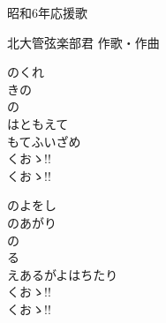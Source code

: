 \documentclass[10pt,b5j]{tarticle} %
\begin{document}
\begin{minipage}[c]{0.7\hsize} %
    \begin{center}
        {\LARGE
            昭和6年応援歌 %
        }
        {\small 
        }
    \end{center}
\end{minipage}
\begin{minipage}[c]{0.3\hsize} %
    \begin{flushright} %
        北大管弦楽部君 作歌・作曲 %
    \end{flushright}
\end{minipage}

\vspace{1.5em} %
\newcommand{\linespace}{0.5em} %
\newcommand{\blocksize}{0.5\hsize} %
\begin{enumerate} %
    \begin{minipage}[c]{\blocksize}
    
        \vspace{\linespace}
        \item
        のくれ\\
        きの\\
        の\\
        はともえて\\
        もてふいざめ\\
        くおゝ!!\\
        くおゝ!!
        
        \vspace{\linespace}
        \item
        のよをし\\
        のあがり\\
        の\\
        る\\
        えあるがよはちたり\\
        くおゝ!!\\
        くおゝ!!
    
    \end{minipage}
\end{enumerate} %
\end{document}
